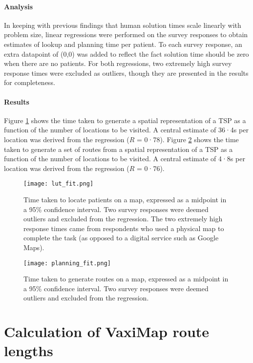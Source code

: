 \documentclass[review]{elsarticle}
\def\vm{VaxiMap}
\begin{document}
\paragraph{Analysis} In keeping with previous findings that human solution times scale linearly with problem size, linear regressions were performed on the survey responses to obtain estimates of lookup and planning time per patient. To each survey response, an extra datapoint of (0,0) was added to reflect the fact solution time should be zero when there are no patients. For both regressions, two extremely high survey response times were excluded as outliers, though they are presented in the results for completeness. 

\paragraph{Results} Figure \ref{lut_fit} shows the time taken to generate a spatial representation of a TSP as a function of the number of locations to be visited. A central estimate of 36·4s per location was derived from the regression ($R$ = 0·78). Figure \ref{planning_fit} shows the time taken to generate a set of routes from a spatial representation of a TSP as a function of the number of locations to be visited. A central estimate of 4·8s per location was derived from the regression ($R$ = 0·76). 

\begin{figure}[H]
\centering
\texttt{[image: lut\_fit.png]}
\caption{Time taken to locate patients on a map, expressed as a midpoint in a 95\% confidence interval. Two survey responses were deemed outliers and excluded from the regression. The two extremely high response times came from respondents who used a physical map to complete the task (as opposed to a digital service such as Google Maps).}
\label{lut_fit}
\end{figure}

\begin{figure}[H]
\centering
\texttt{[image: planning\_fit.png]}
\caption{Time taken to generate routes on a map, expressed as a midpoint in a 95\% confidence interval. Two survey responses were deemed outliers and excluded from the regression.}
\label{planning_fit}
\end{figure}

\section{Calculation of \vm{} route lengths}
\end{document}
